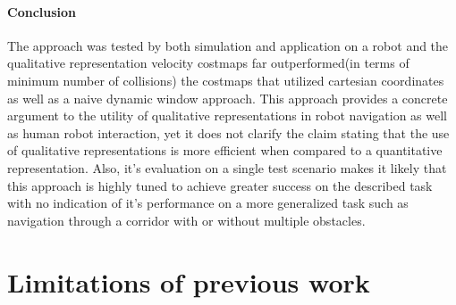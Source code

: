 \begin{itemize}
	
	\paragraph{Conclusion}The approach was tested by both simulation and application on a robot and the qualitative representation velocity costmaps far outperformed(in terms of minimum number of collisions) the costmaps that utilized cartesian coordinates as well as a naive dynamic window approach. This approach provides a concrete argument to the utility of qualitative representations in robot navigation as well as human robot interaction, yet it does not clarify the claim stating that the use of qualitative representations is more efficient when compared to a quantitative representation. Also, it's evaluation on a single test scenario makes it likely that this approach is highly tuned to achieve greater success on the described task with no indication of it's performance on a more generalized task such as navigation through a corridor with or without multiple obstacles.

\end{itemize}

\section{Limitations of previous work}

